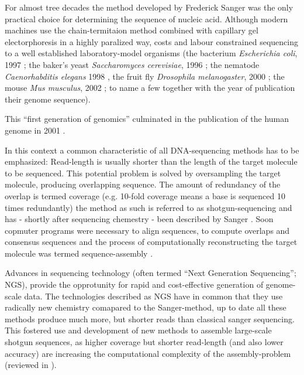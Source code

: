 For almost tree decades the method developed by Frederick Sanger
\cite{pmid271968} was the only practical choice for determining the
sequence of nucleic acid. Although modern machines use the
chain-termitaion method combined with capillary gel electorphoresis
\cite{pmid2326186} in a highly paralized way, costs and labour
constrained sequencing to a well established laboratory-model
organisms (the bacterium \textit{Escherichia coli}, 1997
\cite{pmid9278503}; the baker's yeast \textit{Saccharomyces
  cerevisiae}, 1996 \cite{pmid8849441}; the nematode
\textit{Caenorhabditis elegans} 1998 \cite{pmid9851916}, the fruit fly
\textit{Drosophila melanogaster}, 2000 \cite{adams2000genome}; the
mouse \textit{Mus musculus}, 2002 \cite{pmid12466850}; to name a few
together with the year of publication their genome sequence).

This ``first generation of genomics'' culminated in the publication of
the human genome in 2001 \cite{pmid11181995}.


In this context a common characteristic of all DNA-sequencing methods
has to be emphasized: Read-length is usually shorter than the length
of the target molecule to be sequenced. This potential problem is
solved by oversampling the target molecule, producing overlapping
sequence. The amount of redundancy of the overlap is termed coverage
(e.g. 10-fold coverage means a base is sequenced 10 times redundantly)
the method as such is referred to as shotgun-sequencing and has -
shortly after sequencing chemestry - been described by Sanger
\cite{pmid6260957}. Soon copmuter programs were necessary to align
sequences, to compute overlaps and consensus sequences
\cite{pmid461197} and the process of computationally reconstructing
the target molecule was termed sequence-assembly \cite{pmid6251542}.

Advances in sequencing technology (often termed ``Next Generation
Sequencing''; NGS), provide the opprotunity for rapid and
cost-effective generation of genome-scale data. The technologies
described as NGS have in common that they use radically new chemistry
comapared to the Sanger-method, up to date all these methods produce
much more, but shorter reads than classical sanger sequencing. This
fostered use and development of new methods to assemble large-scale
shotgun sequences, as higher coverage but shorter read-length (and
also lower accuracy) are increasing the computational complexity of
the assembly-problem (reviewed in \cite{pmid20211242}).


